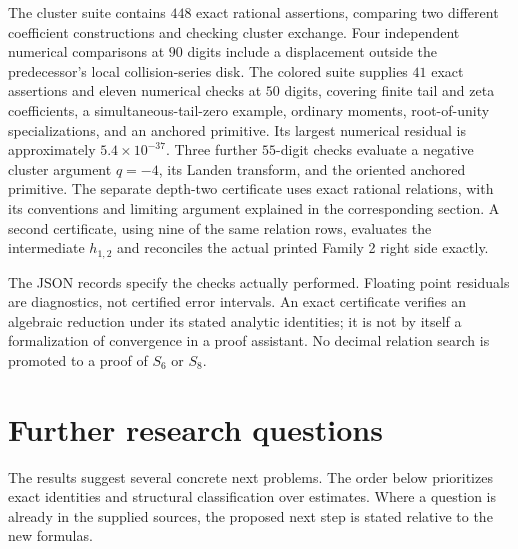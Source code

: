 \documentclass[11pt,a4paper]{article}
\numberwithin{equation}{section}
\theoremstyle{definition}
\theoremstyle{remark}
\begin{document}
The cluster suite contains $448$ exact rational assertions,
comparing two different coefficient constructions and checking
cluster exchange. Four independent numerical comparisons at
$90$ digits include a displacement outside the predecessor's
local collision-series disk. The colored suite supplies $41$ exact assertions and eleven
numerical checks at $50$ digits, covering finite tail and zeta
coefficients, a simultaneous-tail-zero example, ordinary moments,
root-of-unity specializations, and an anchored primitive. Its
largest numerical residual is approximately $5.4\times10^{-37}$.
Three further $55$-digit checks evaluate a negative cluster argument
$q=-4$, its Landen transform, and the oriented anchored primitive.
The separate depth-two certificate uses exact rational
relations, with its conventions and limiting argument explained
in the corresponding section. A second certificate, using nine
of the same relation rows, evaluates the intermediate $h_{1,2}$
and reconciles the actual printed Family 2 right side exactly.

The JSON records specify the checks actually performed. Floating
point residuals are diagnostics, not certified error intervals.
An exact certificate verifies an algebraic reduction under its
stated analytic identities; it is not by itself a formalization
of convergence in a proof assistant. No decimal relation search
is promoted to a proof of $S_6$ or $S_8$.

\section{Further research questions}
\label{sec:research}

The results suggest several concrete next problems. The order below
prioritizes exact identities and structural classification over
estimates. Where a question is already in the supplied sources,
the proposed next step is stated relative to the new formulas.
\end{document}
